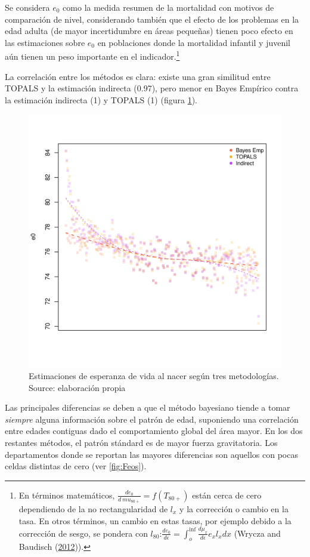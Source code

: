 \documentclass[12pt,]{article}
\begin{document}
Se considera \(e_0\) como la medida resumen de la mortalidad con motivos
de comparación de nivel, considerando también que el efecto de los
problemas en la edad adulta (de mayor incertidumbre en áreas pequeñas)
tienen poco efecto en las estimaciones sobre \(e_0\) en poblaciones
donde la mortalidad infantil y juvenil aún tienen un peso importante en
el indicador.\footnote{En términos matemáticos,
  \(\frac{de_0} {d \ mu_ {80 +}} = f (T_ {80 +})\) están cerca de cero
  dependiendo de la no rectangularidad de \(l_x\) y la corrección o
  cambio en la tasa. En otros términos, un cambio en estas tasas, por
  ejemplo debido a la corrección de sesgo, se pondera con
  \(l_{80}\):\(\frac{de_0} {d \epsilon} = \int_{o}^{\inf}{\frac{d\mu_x} {d \epsilon} e_x l_x dx}\)
  (Wrycza and Baudisch (\protect\hyperlink{ref-Wrycza2012}{2012})).}

La correlación entre los métodos es clara: existe una gran similitud
entre TOPALS y la estimación indirecta (0.97), pero menor en Bayes
Empírico contra la estimación indirecta (1) y TOPALS (1) (figura
\ref{fig:comparativeMeth}).

\begin{figure}

{\centering \includegraphics[width=0.7\linewidth]{plots/CompMethods} 

}

\caption{Estimaciones de esperanza de vida al nacer según tres metodologías. Source: elaboración propia}\label{fig:comparativeMeth}
\end{figure}

Las principales diferencias se deben a que el método bayesiano tiende a
tomar \emph{siempre} alguna información sobre el patrón de edad,
suponiendo una correlación entre edades contiguas dado el comportamiento
global del área mayor. En los dos restantes métodos, el patrón stándard
es de mayor fuerza gravitatoria. Los departamentos donde se reportan las
mayores diferencias son aquellos con pocas celdas distintas de cero (ver
\ref{fig:Feos}).
\end{document}
